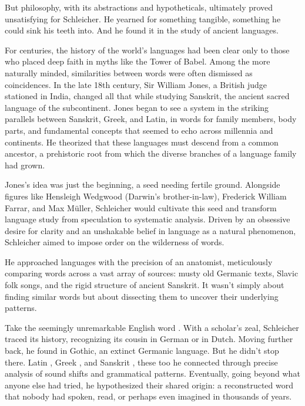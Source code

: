 But philosophy, with its abstractions and hypotheticals, ultimately proved unsatisfying for Schleicher. He yearned for something tangible, something he could sink his teeth into. And he found it in the study of ancient languages.

\bigskip

For centuries, the history of the world's languages had been clear only to those who placed deep faith in myths like the Tower of Babel. Among the more naturally minded, similarities between words were often dismissed as coincidences. In the late 18th century, Sir William Jones, a British judge stationed in India, changed all that while studying Sanskrit, the ancient sacred language of the subcontinent. Jones began to see a system in the striking parallels between Sanskrit, Greek, and Latin, in words for family members, body parts, and fundamental concepts that seemed to echo across millennia and continents. He theorized that these languages must descend from a common ancestor, a prehistoric root from which the diverse branches of a language family had grown.

Jones's idea was just the beginning, a seed needing fertile ground. Alongside figures like Hensleigh Wedgwood (Darwin's brother-in-law), Frederick William Farrar, and Max Müller, Schleicher would cultivate this seed and transform language study from speculation to systematic analysis. Driven by an obsessive desire for clarity and an unshakable belief in language as a natural phenomenon, Schleicher aimed to impose order on the wilderness of words.

He approached languages with the precision of an anatomist, meticulously comparing words across a vast array of sources: musty old Germanic texts, Slavic folk songs, and the rigid structure of ancient Sanskrit. It wasn't simply about finding similar words but about dissecting them to uncover their underlying patterns.

Take the seemingly unremarkable English word . With a scholar's zeal, Schleicher traced its history, recognizing its cousin  in German or  in Dutch. Moving further back, he found  in Gothic, an extinct Germanic language. But he didn't stop there. Latin , Greek , and Sanskrit , these too he connected through precise analysis of sound shifts and grammatical patterns. Eventually, going beyond what anyone else had tried, he hypothesized their shared origin: a reconstructed word that nobody had spoken, read, or perhaps even imagined in thousands of years.

